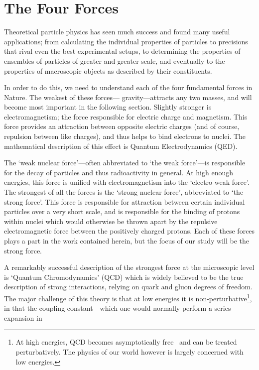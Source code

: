 \documentclass[11pt,a4paper,twoside]{carrollthesis}
\newcommand{\emdash}{\hspace{1pt}---\hspace{1pt}}
\begin{document}
\section{The Four Forces}\label{sec:fourforces}
%
Theoretical particle physics has seen much success and found many
useful applications; from calculating the individual properties of
particles to precisions that rival even the best experimental setups,
to determining the properties of ensembles of particles of greater and
greater scale, and eventually to the properties of macroscopic objects
as described by their constituents.\par
%
In order to do this, we need to understand each of the four
fundamental forces in Nature. The weakest of these forces\emdash
gravity\emdash attracts any two masses, and will become most important
in the following section. Slightly stronger is electromagnetism; the
force responsible for electric charge and magnetism. This force
provides an attraction between opposite electric charges (and of
course, repulsion between like charges), and thus helps to bind
electrons to nuclei. The mathematical description of this effect is
Quantum Electrodynamics (QED).\par
%
The `weak nuclear force'\emdash often abbreviated to `the weak
force'\emdash is responsible for the decay of particles and thus
radioactivity in general. At high enough energies, this force is
unified with electromagnetism into the `electro-weak force'. The
strongest of all the forces is the `strong nuclear force', abbreviated
to `the strong force'. This force is responsible for attraction
between certain individual particles over a very short scale, and is
responsible for the binding of protons within nuclei which would
otherwise be thrown apart by the repulsive electromagnetic force
between the positively charged protons. Each of these forces plays a
part in the work contained herein, but the focus of our study will be
the strong force.\par
%
A remarkably successful description of the strongest force at the
microscopic level is `Quantum Chromodynamics' (QCD) which is widely
believed to be the true description of strong interactions, relying on
quark and gluon degrees of freedom. The major challenge of this theory
is that at low energies it is non-perturbative\footnote{At high
  energies, QCD becomes asymptotically free~\cite{Gross:1973ju} and
  can be treated perturbatively. The physics of our world however is
  largely concerned with low energies.}, in that the coupling
constant\emdash which one would normally perform a series-expansion in
\end{document}
